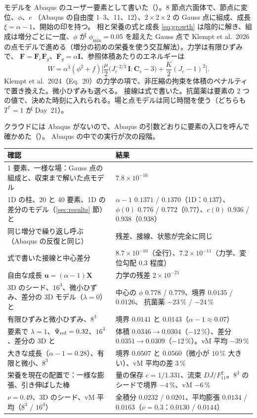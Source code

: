\documentclass[11pt,a4paper]{article}
\theoremstyle{definition}
\begin{document}
モデルを Abaqus のユーザー要素として書いた（）。8 節点六面体で、節点に変位、$\phi$、$c$
（Abaqus の自由度 1--3、11、12）、$2\times2\times2$ の Gauss 点に組成、成長 $\xi=\alpha-1$、開始の印を持つ。
相と栄養の式と成長 \eqref{eq:growth} は陰的に解き、組成は増分ごとに一度、$\phi$ が $\phi_{\min}=0.05$ を超えた Gauss 点で
Klempt et al.\ 2026 の点モデルで進める（増分の初めの栄養を使う交互解法）。力学は有限ひずみで、
$\mathbf F=\mathbf F_e\mathbf F_g$、$\mathbf F_g=\alpha\mathbf I$、参照体積あたりのエネルギーは
\[W=\alpha^3(\phi^2+f)\Big[\frac{\mu}{2}\big(J_e^{-2/3}\,\mathbf I:\mathbf C_e-3\big)+\frac K2(J_e-1)^2\Big].\]
Klempt et al.\ 2024（Eq.~20）の力学の項で、非圧縮の拘束を体積のペナルティで置き換えた。微小ひずみも選べる。
接線は式で書いた。抗菌薬は要素の 2 つの値で、決めた時刻に入れられる。場と点モデルは同じ時間を使う（どちらも $T^*=1$ が Day~21）。

クラウドには Abaqus がないので、Abaqus の引数どおりに要素の入口を呼んで確かめた（）。
Abaqus の中での実行が次の段階。

\begin{center}\small
\begin{tabularx}{\linewidth}{@{}Yp{5.4cm}@{}}
\toprule
確認 & 結果\\
 要素、一様な場：Gauss 点の組成と、収束まで解いた点モデル & $7.8\times10^{-16}$\\
1D の柱、20 と 40 要素、1D の差分のモデル（\ref{sec:results} 節）と & $\alpha-1$ $0.1371$ / $0.1370$（1D：$0.137$）、
$\phi(0)$ $0.776$ / $0.772$（$0.77$）、$c(0)$ $0.936$ / $0.938$（$0.938$）\\
同じ増分で繰り返し呼ぶ（Abaqus の反復と同じ） & 残差、接線、状態が完全に同じ\\
式で書いた接線と中心差分 & $8.7\times10^{-10}$（全行）、$7.2\times10^{-11}$（力学、変位勾配 $0.3$ 程度）\\
自由な成長 $\mathbf u=(\alpha-1)\mathbf X$ & 力学の残差 $2\times10^{-21}$\\
3D のシード、$16^3$、微小ひずみ、差分の 3D モデル（$\lambda=0$）と & 中心の $\phi$ $0.778$ / $0.779$、境界 $0.0135$ / $0.0126$、
抗菌薬 $-23\,\%$ / $-24\,\%$\\
有限ひずみと微小ひずみ、$8^3$ & 境界 $0.0141$ と $0.0143$（$\alpha-1\approx0.07$）\\
要素で $\lambda=1$、$\Psi_{\rm ref}=0.32$、$16^3$、差分の 3D と & 体積 $0.0346\to0.0304$（$-12\,\%$）、差分 $0.0351\to0.0309$（$-12\,\%$）。vM 平均 $-39\,\%$\\
大きな成長（$\alpha-1=0.28$）、有限と微小、$8^3$ & 境界 $0.0507$ と $0.0560$（微小が $10\,\%$ 大きい）、vM 平均の差 $3\,\%$\\
栄養を現在の配置で：一様な膨張、引き伸ばした棒 & 量の保存 $c=1/1.331$、流束 $DJ/F_{11}^2$。$8^3$ のシードで境界 $-4\,\%$、vM $-6\,\%$\\
$\nu=0.49$、3D のシード、vM 平均（$8^3$ / $16^3$） & 全積分 $0.0232$ / $0.0201$、平均膨張 $0.0134$ / $0.0163$（$\nu=0.3$：$0.0130$ / $0.0144$）\\
\bottomrule
\end{tabularx}
\end{center}
\end{document}
